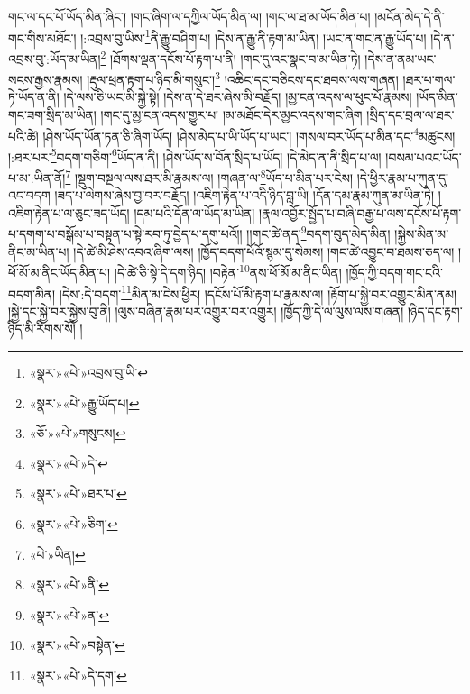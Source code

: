གང་ལ་དང་པོ་ཡོད་མིན་ཞིང་། །གང་ཞིག་ལ་དཀྱིལ་ཡོད་མིན་ལ། །གང་ལ་ཐ་མ་ཡོད་མིན་པ། །མངོན་མེད་དེ་ནི་གང་གིས་མཐོང་། །:འབྲས་བུ་ཡིས་\footnote{«སྣར་»«པེ་»འབྲས་བུ་ཡི་}ནི་རྒྱུ་བཤིག་པ། །དེས་ན་རྒྱུ་ནི་རྟག་མ་ཡིན། །ཡང་ན་གང་ན་རྒྱུ་ཡོད་པ། །དེ་ན་འབྲས་བུ་:ཡོད་མ་ཡིན།\footnote{«སྣར་»«པེ་»རྒྱུ་ཡོད་པ།} །ཐོགས་ལྡན་དངོས་པོ་རྟག་པ་ནི། །གང་དུ་འང་སྣང་བ་མ་ཡིན་ཏེ། །དེས་ན་ནམ་ཡང་སངས་རྒྱས་རྣམས། །རྡུལ་ཕྲན་རྟག་པ་ཉིད་མི་གསུང་།\footnote{«ཅོ་»«པེ་»གསུངས།} །འཆིང་དང་བཅིངས་དང་ཐབས་ལས་གཞན། །ཐར་པ་གལ་ཏེ་ཡོད་ན་ནི། །དེ་ལས་ཅི་ཡང་མི་སྐྱེ་སྟེ། །དེས་ན་དེ་ཐར་ཞེས་མི་བརྗོད། །མྱ་ངན་འདས་ལ་ཕུང་པོ་རྣམས། །ཡོད་མིན་གང་ཟག་སྲིད་མ་ཡིན། །གང་དུ་མྱ་ངན་འདས་གྱུར་པ། །མ་མཐོང་དེར་མྱང་འདས་གང་ཞིག །སྲིད་དང་བྲལ་ལ་ཐར་པའི་ཚེ། །ཤེས་ཡོད་ཡོན་ཏན་ཅི་ཞིག་ཡོད། །ཤེས་མེད་པ་ཡི་ཡོད་པ་ཡང་། །གསལ་བར་ཡོད་པ་མིན་དང་\footnote{«སྣར་»«པེ་»དེ་}མཚུངས། །:ཐར་པར་\footnote{«སྣར་»«པེ་»ཐར་པ་}བདག་གཅིག་\footnote{«སྣར་»«པེ་»ཅིག་}ཡོད་ན་ནི། །ཤེས་ཡོད་ས་བོན་སྲིད་པ་ཡོད། །དེ་མེད་ན་ནི་སྲིད་པ་ལ། །བསམ་པའང་ཡོད་པ་མ་:ཡིན་ནོ།\footnote{«པེ་»ཡིན།} །སྡུག་བསྔལ་ལས་ཐར་མི་རྣམས་ལ། །གཞན་ལ་\footnote{«སྣར་»«པེ་»ནི་}ཡོད་པ་མིན་པར་ངེས། །དེ་ཕྱིར་རྣམ་པ་ཀུན་དུ་འང་བདག །ཟད་པ་ལེགས་ཞེས་བྱ་བར་བརྗོད། །འཇིག་རྟེན་པ་འདི་ཉིད་བླ་ཡི། །དོན་དམ་རྣམ་ཀུན་མ་ཡིན་ཏེ། །འཇིག་རྟེན་པ་ལ་ཅུང་ཟད་ཡོད། །དམ་པའི་དོན་ལ་ཡོད་མ་ཡིན། །རྣལ་འབྱོར་སྤྱོད་པ་བཞི་བརྒྱ་པ་ལས་དངོས་པོ་རྟག་པ་དགག་པ་བསྒོམ་པ་བསྟན་པ་སྟེ་རབ་ཏུ་བྱེད་པ་དགུ་པའོ།། །།གང་ཚེ་ནད་\footnote{«སྣར་»«པེ་»ན་}བདག་བུད་མེད་མིན། །སྐྱེས་མིན་མ་ནིང་མ་ཡིན་པ། །དེ་ཚེ་མི་ཤེས་འབའ་ཞིག་ལས། །ཁྱོད་བདག་ཕོའོ་སྙམ་དུ་སེམས། །གང་ཚེ་འབྱུང་བ་ཐམས་ཅད་ལ། །ཕོ་མོ་མ་ནིང་ཡོད་མིན་པ། །དེ་ཚེ་ཅི་སྟེ་དེ་དག་ཉིད། །བརྟེན་\footnote{«སྣར་»«པེ་»བསྟེན་}ནས་ཕོ་མོ་མ་ནིང་ཡིན། །ཁྱོད་ཀྱི་བདག་གང་ངའི་བདག་མིན། །དེས་:དེ་བདག་\footnote{«སྣར་»«པེ་»དེ་དག་}མིན་མ་ངེས་ཕྱིར། །དངོས་པོ་མི་རྟག་པ་རྣམས་ལ། །རྟོག་པ་སྐྱེ་བར་འགྱུར་མིན་ནམ། །སྐྱེ་དང་སྐྱེ་བར་སྐྱེས་བུ་ནི། །ལུས་བཞིན་རྣམ་པར་འགྱུར་བར་འགྱུར། །ཁྱོད་ཀྱི་དེ་ལ་ལུས་ལས་གཞན། །ཉིད་དང་རྟག་ཉིད་མི་རིགས་སོ། །
